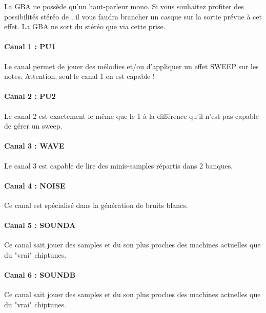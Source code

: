 \documentclass[12pt,a4paper]{article}
\begin{document}
    La GBA ne possède qu'un haut-parleur mono.
    Si vous souhaitez profiter des possibilités stéréo de \FAT, il vous faudra brancher un casque sur la sortie prévue à cet effet.
    La GBA ne sort du stéréo que via cette prise.
    
    \paragraph{Canal 1 : PU1} Le canal permet de jouer des mélodies et/ou d'appliquer un effet SWEEP sur les notes. Attention, seul le canal 1 en est capable !


    \paragraph{Canal 2 : PU2} Le canal 2 est exactement le même que le 1 à la différence qu'il n'est pas capable de gérer un sweep.


    \paragraph{Canal 3 : WAVE} Le canal 3 est capable de lire des minis-samples répartis dans 2 banques.


    \paragraph{Canal 4 : NOISE} Ce canal est spécialisé dans la génération de bruits blancs.


    \paragraph{Canal 5 : SOUNDA} Ce canal sait jouer des samples et du son plus proches des machines actuelles que du "vrai" chiptunes.

    \paragraph{Canal 6 : SOUNDB} Ce canal sait jouer des samples et du son plus proches des machines actuelles que du "vrai" chiptunes.
\end{document}
